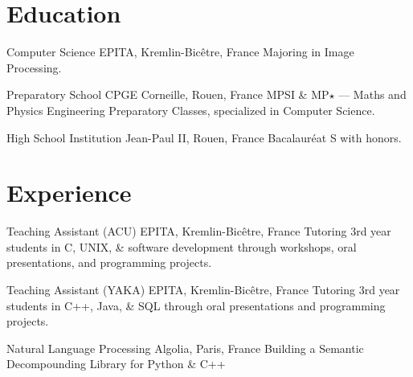 \documentclass[letterpaper]{twentysecondcv} %
\begin{document}
\section{Education}

\begin{twenty} %

    {Computer Science}
    {EPITA, Kremlin-Bicêtre, France}
    {Majoring in Image Processing.}

    {Preparatory School}
    {CPGE Corneille, Rouen, France}
    {MPSI \& MP$\star$ --- Maths and Physics Engineering Preparatory Classes,
    specialized in Computer Science.}

    {High School}
    {Institution Jean-Paul II, Rouen, France}
    {Bacalauréat S with honors.}

\end{twenty}


\section{Experience}

\begin{twenty}

    {Teaching Assistant (ACU)}
    {EPITA, Kremlin-Bicêtre, France}
    {Tutoring 3rd year students in C, UNIX, \& software development through
    workshops, oral presentations, and programming projects.}

    {Teaching Assistant (YAKA)}
    {EPITA, Kremlin-Bicêtre, France}
    {Tutoring 3rd year students in C++, Java, \& SQL through oral presentations
    and programming projects.}

    {Natural Language Processing}
    {Algolia, Paris, France}
    {Building a Semantic Decompounding Library for Python \& C++}

\end{twenty}

\end{document}
